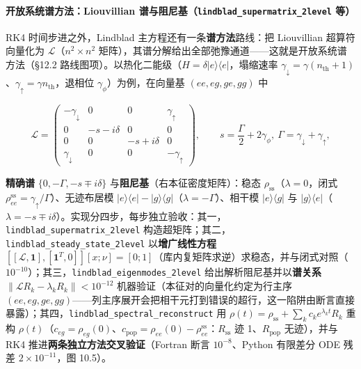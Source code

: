 \documentclass[
]{ctexbook}
\begin{document}
\hypertarget{ux5f00ux653eux7cfbux7edfux8c31ux65b9ux6cd5liouvillian-ux8c31ux4e0eux963bux5c3cux57falindblad_supermatrix_2level-ux7b49}{%
\paragraph{\texorpdfstring{开放系统谱方法：Liouvillian
谱与阻尼基（\texttt{lindblad\_supermatrix\_2level}
等）}{开放系统谱方法：Liouvillian 谱与阻尼基（lindblad\_supermatrix\_2level 等）}}\label{ux5f00ux653eux7cfbux7edfux8c31ux65b9ux6cd5liouvillian-ux8c31ux4e0eux963bux5c3cux57falindblad_supermatrix_2level-ux7b49}}

RK4 时间步进之外，Lindblad 主方程还有一条\textbf{谱方法}路线：把
Liouvillian 超算符向量化为 \(\mathcal{L}\)（\(n^{2}\times n^{2}\)
矩阵），其谱分解给出全部弛豫通道------这就是开放系统谱方法（§12.2
路线图项）。以热化二能级（\(H=\delta|e\rangle\langle e|\)，塌缩速率
\(\gamma_{\downarrow}=\gamma(n_{\mathrm{th}}+1)\)、\(\gamma_{\uparrow}=\gamma n_{\mathrm{th}}\)，退相位
\(\gamma_\phi\)）为例，在向量基 \((ee,eg,ge,gg)\) 中

\[\mathcal{L}=\begin{pmatrix}-\gamma_\downarrow&0&0&\gamma_\uparrow\\
0&-s-i\delta&0&0\\0&0&-s+i\delta&0\\\gamma_\downarrow&0&0&-\gamma_\uparrow\end{pmatrix},
\qquad s=\frac{\Gamma}{2}+2\gamma_\phi,\ \Gamma=\gamma_\downarrow+\gamma_\uparrow,\]

\textbf{精确谱} \(\{0,-\Gamma,-s\mp i\delta\}\)
与\textbf{阻尼基}（右本征密度矩阵）：稳态
\(\rho_{\mathrm{ss}}\)（\(\lambda=0\)，闭式
\(\rho_{ee}^{\mathrm{ss}}=\gamma_\uparrow/\Gamma\)）、无迹布居模
\(|e\rangle\langle e|-|g\rangle\langle g|\)（\(\lambda=-\Gamma\)）、相干模
\(|e\rangle\langle g|\) 与
\(|g\rangle\langle e|\)（\(\lambda=-s\mp i\delta\)）。实现分四步，每步独立验收：其一，\texttt{lindblad\_supermatrix\_2level}
构造超矩阵；其二，\texttt{lindblad\_steady\_state\_2level}
以\textbf{增广线性方程}
\([[\mathcal{L},\mathbf{1}],[\mathbf{1}^{T},0]][x;\nu]=[0;1]\)（库内复矩阵求逆）求稳态，并与闭式对照（\(10^{-10}\)）；其三，\texttt{lindblad\_eigenmodes\_2level}
给出解析阻尼基并以\textbf{谱关系}
\(\lVert\mathcal{L}R_k-\lambda_kR_k\rVert<10^{-12}\)
机器验证（本征对的向量化约定为行主序
\((ee,eg,ge,gg)\)------列主序展开会把相干元打到错误的超行，这一陷阱由断言直接暴露）；其四，\texttt{lindblad\_spectral\_reconstruct}
用 \(\rho(t)=\rho_{\mathrm{ss}}+\sum_k c_k e^{\lambda_k t}R_k\) 重构
\(\rho(t)\)（\(c_{eg}=\rho_{eg}(0)\)、\(c_{\mathrm{pop}}=\rho_{ee}(0)-\rho_{ee}^{\mathrm{ss}}\)：\(R_{\mathrm{ss}}\)
迹 1、\(R_{\mathrm{pop}}\) 无迹），并与 RK4
推进\textbf{两条独立方法交叉验证}（Fortran 断言 \(10^{-8}\)、Python
有限差分 ODE 残差 \(2\times10^{-11}\)，图 10.5）。
\end{document}
